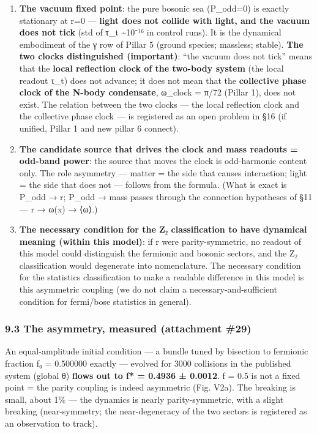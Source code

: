 \documentclass[
]{article}
\providecommand{\tightlist}{%
  \setlength{\itemsep}{0pt}\setlength{\parskip}{0pt}}
\begin{document}
\begin{enumerate}
\def\labelenumi{\arabic{enumi}.}
\tightlist
\item
  \textbf{The vacuum fixed point}: the pure bosonic sea (P\_odd=0) is
  exactly stationary at r=0 --- \textbf{light does not collide with
  light, and the vacuum does not tick} (std of τ\_t \textasciitilde10⁻¹⁶
  in control runs). It is the dynamical embodiment of the γ row of
  Pillar 5 (ground species; massless; stable). \textbf{The two clocks
  distinguished (important)}: ``the vacuum does not tick'' means that
  the \textbf{local reflection clock of the two-body system} (the local
  readout τ\_t) does not advance; it does not mean that the
  \textbf{collective phase clock of the N-body condensate}, ω\_clock =
  π/72 (Pillar 1), does not exist. The relation between the two clocks
  --- the local reflection clock and the collective phase clock --- is
  registered as an open problem in §16 (if unified, Pillar 1 and new
  pillar 6 connect).
\item
  \textbf{The candidate source that drives the clock and mass readouts =
  odd-band power}: the source that moves the clock is odd-harmonic
  content only. The role asymmetry --- matter = the side that causes
  interaction; light = the side that does not --- follows from the
  formula. (What is exact is P\_odd → r; P\_odd → mass passes through
  the connection hypotheses of §11 --- r → ω(x) → ⟨ω⟩.)
\item
  \textbf{The necessary condition for the Z₂ classification to have
  dynamical meaning (within this model)}: if r were parity-symmetric, no
  readout of this model could distinguish the fermionic and bosonic
  sectors, and the Z₂ classification would degenerate into nomenclature.
  The necessary condition for the statistics classification to make a
  readable difference in this model is this asymmetric coupling (we do
  not claim a necessary-and-sufficient condition for fermi/bose
  statistics in general).
\end{enumerate}

\subsubsection{9.3 The asymmetry, measured (attachment
\#29)}\label{the-asymmetry-measured-attachment-29}

An equal-amplitude initial condition --- a bundle tuned by bisection to
fermionic fraction f₀ = 0.500000 exactly --- evolved for 3000 collisions
in the published system (global θ) \textbf{flows out to f* = 0.4936 ±
0.0012}. f = 0.5 is not a fixed point = the parity coupling is indeed
asymmetric (Fig. V2a). The breaking is small, about 1\% --- the dynamics
is nearly parity-symmetric, with a slight breaking (near-symmetry; the
near-degeneracy of the two sectors is registered as an observation to
track).
\end{document}
